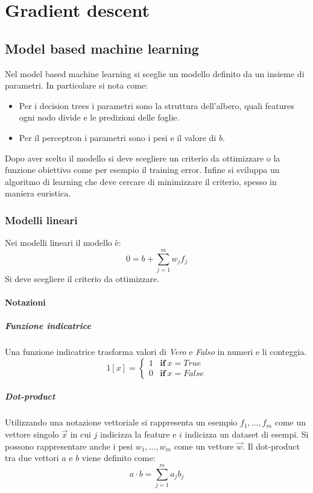 \chapter{Gradient descent}

\section{Model based machine learning}
Nel model based machine learning si sceglie un modello definito da un insieme di parametri.
In particolare si nota come:
\begin{multicols}{2}
	\begin{itemize}
		\item Per i decision trees i parametri sono la struttura dell'albero, quali features ogni nodo divide e le predizioni delle foglie.
		\item Per il perceptron i parametri sono i pesi e il valore di $b$.
	\end{itemize}
\end{multicols}
Dopo aver scelto il modello si deve scegliere un criterio da ottimizzare o la funzione obiettivo come per esempio il training error.
Infine si sviluppa un algoritmo di learning che deve cercare di minimizzare il criterio, spesso in maniera euristica.

	\subsection{Modelli lineari}
	Nei modelli lineari il modello \`e:
	$$0=b+\sum\limits_{j=1}^mw_jf_j$$
	Si deve scegliere il criterio da ottimizzare.

		\subsubsection{Notazioni}

			\paragraph{Funzione indicatrice}
			Una funzione indicatrice trasforma valori di \emph{Vero} e \emph{Falso} in numeri e li conteggia.
			$$1[x]=\begin{cases}1&\mathbf{if}\ x = True\\
										  	0&\textbf{if}\ x = False
				 	\end{cases}$$

			\paragraph{Dot-product}
			Utilizzando una notazione vettoriale si rappresenta un esempio $f_1,\dots,f_m$ come un vettore singolo $\overrightarrow{x}$ in cui $j$ indicizza la feature e $i$ indicizza un dataset di esempi.
			Si possono rappresentare anche i pesi $w_1,\dots,w_m$ come un vettore $\overrightarrow{w}$.
			Il dot-product tra due vettori $a$ e $b$ viene definito come:
			$$a\cdot b = \sum\limits_{j=1}^ma_jb_j$$

